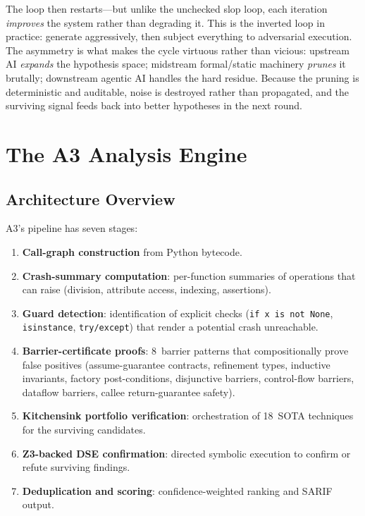 \documentclass[sigconf,review,anonymous]{acmart}
\begin{document}
The loop then restarts---but unlike the unchecked slop loop, each iteration \emph{improves} the system rather than degrading it.
This is the inverted loop in practice: generate aggressively, then subject everything to adversarial execution.
The asymmetry is what makes the cycle virtuous rather than vicious: upstream AI \emph{expands} the hypothesis space; midstream formal/static machinery \emph{prunes} it brutally; downstream agentic AI handles the hard residue.
Because the pruning is deterministic and auditable, noise is destroyed rather than propagated, and the surviving signal feeds back into better hypotheses in the next round.

\section{The \textsc{A3} Analysis Engine}\label{sec:engine}

\subsection{Architecture Overview}

\textsc{A3}'s pipeline has seven stages:
\begin{enumerate}
  \item \textbf{Call-graph construction} from Python bytecode.
  \item \textbf{Crash-summary computation}: per-function summaries of operations that can raise (division, attribute access, indexing, assertions).
  \item \textbf{Guard detection}: identification of explicit checks (\texttt{if x is not None}, \texttt{isinstance}, \texttt{try/except}) that render a potential crash unreachable.
  \item \textbf{Barrier-certificate proofs}: 8~barrier patterns that compositionally prove false positives (assume-guarantee contracts, refinement types, inductive invariants, factory post-conditions, disjunctive barriers, control-flow barriers, dataflow barriers, callee return-guarantee safety).
  \item \textbf{Kitchensink portfolio verification}: orchestration of 18~SOTA techniques for the surviving candidates.
  \item \textbf{Z3-backed DSE confirmation}: directed symbolic execution to confirm or refute surviving findings.
  \item \textbf{Deduplication and scoring}: confidence-weighted ranking and SARIF output.
\end{enumerate}
\end{document}
